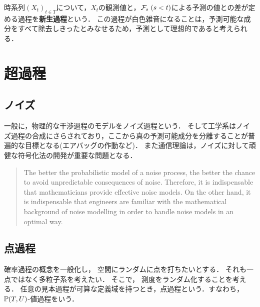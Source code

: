 \documentclass[uplatex,dvipdfmx]{jsreport}
\begin{document}
\begin{definition}
    
\end{definition}

\begin{definition}[innovation]
    時系列$(X_t)_{t\in T}$について，$X_t$の観測値と，$\mathcal{F}_s\;(s<t)$による予測の値との差が定める過程を\textbf{新生過程}という．
    この過程が白色雑音になることは，予測可能な成分をすべて除去しきったとみなせるため，予測として理想的であると考えられる．
\end{definition}

\chapter{超過程}

\section{ノイズ}

一般に，物理的な干渉過程のモデルをノイズ過程という．
そして工学系はノイズ過程の合成にさらされており，ここから真の予測可能成分を分離することが普遍的な目標となる(エアバッグの作動など)．
また通信理論は，ノイズに対して頑健な符号化法の開発が重要な問題となる．
\begin{quote}
    The
better the probabilistic model of a noise process, the better the chance to
avoid unpredictable consequences of noise. Therefore, it is indispensable
that mathematicians provide effective noise models. On the other hand, it is
indispensable that engineers are familiar with the mathematical background
of noise modelling in order to handle noise models in an optimal way.\cite{Schaffler}
\end{quote}

\section{点過程}

\begin{tcolorbox}[colframe=ForestGreen, colback=ForestGreen!10!white,breakable,colbacktitle=ForestGreen!40!white,coltitle=black,fonttitle=\bfseries\sffamily,
title=]
    確率過程の概念を一般化し，
    空間にランダムに点を打ちたいとする．
    それも一点ではなく多粒子系を考えたい．
    そこで，
    測度をランダム化することを考える．
    任意の見本過程が可算な定義域を持つとき，点過程という．すなわち，$\mathbb{P}(T,U)$-値過程をいう．
\end{tcolorbox}
\end{document}
